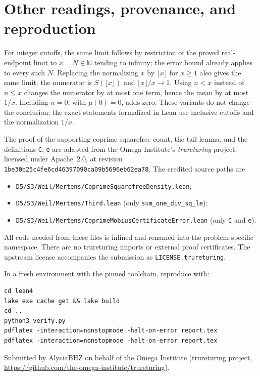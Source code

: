 \documentclass[11pt]{article}
\begin{document}
\section{Other readings, provenance, and reproduction}
For integer cutoffs, the same limit follows by restriction of the proved
real-endpoint limit to $x=N\in\mathbb N$ tending to infinity; the error
bound already applies to every such $N$. Replacing the normalizing $x$
by $\lfloor x\rfloor$ for $x\geq1$ also gives the same limit: the numerator
is $S(\lfloor x\rfloor)$ and $\lfloor x\rfloor/x\to1$.
Using $n<x$ instead of $n\leq x$ changes the numerator by at most one
term, hence the mean by at most $1/x$. Including $n=0$, with
$\mu(0)=0$, adds zero. These variants do not change the conclusion;
the exact statements formalized in Lean use inclusive cutoffs and the
normalization $1/x$.

The proof of the supporting coprime squarefree count, the tail lemma, and
the definitions \texttt{C}, \texttt{e} are adapted from the Omega Institute's
\emph{trureturing} project, licensed under Apache~2.0, at revision
\texttt{1be30b25c4fe6cd46397090ca09b5696eb62ea78}.
The credited source paths are
\begin{itemize}
\item \texttt{D5/S3/Weil/Mertens/CoprimeSquarefreeDensity.lean};
\item \texttt{D5/S3/Weil/Mertens/Third.lean} (only
\texttt{sum\_one\_div\_sq\_le});
\item \texttt{D5/S3/Weil/Mertens/CoprimeMobiusCertificateError.lean}
(only \texttt{C} and \texttt{e}).
\end{itemize}
All code needed from these files is inlined and renamed into the
problem-specific namespace. There are no trureturing imports or external
proof certificates. The upstream license accompanies the submission as
\texttt{LICENSE.trureturing}.

In a fresh environment with the pinned toolchain, reproduce with:
\begin{lstlisting}
cd lean4
lake exe cache get && lake build
cd ..
python3 verify.py
pdflatex -interaction=nonstopmode -halt-on-error report.tex
pdflatex -interaction=nonstopmode -halt-on-error report.tex
\end{lstlisting}

\medskip
\noindent Submitted by AlyciaBHZ on behalf of the Omega Institute
(trureturing project,
\url{https://github.com/the-omega-institute/trureturing}).
\end{document}

